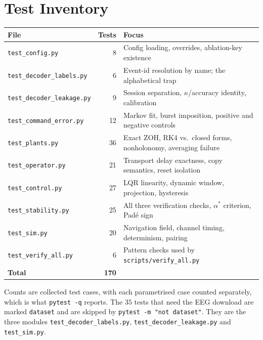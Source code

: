 \documentclass[11pt,a4paper]{article}
\newcommand{\astar}{\alpha^{*}}
\theoremstyle{plain}
\theoremstyle{definition}
\begin{document}
\section{Test Inventory}

\begin{center}
\small
\begin{tabular}{@{}lrp{7.4cm}@{}}
\toprule
File & Tests & Focus \\
\midrule
\texttt{test\_config.py}          & 8  & Config loading, overrides, ablation-key existence \\
\texttt{test\_decoder\_labels.py} & 6  & Event-id resolution by name; the alphabetical trap \\
\texttt{test\_decoder\_leakage.py}& 9  & Session separation, $\kappa$/accuracy identity, calibration \\
\texttt{test\_command\_error.py}  & 12 & Markov fit, burst imposition, positive and negative controls \\
\texttt{test\_plants.py}          & 36 & Exact ZOH, RK4 vs.\ closed forms, nonholonomy, averaging failure \\
\texttt{test\_operator.py}        & 21 & Transport delay exactness, copy semantics, reset isolation \\
\texttt{test\_control.py}         & 27 & LQR linearity, dynamic window, projection, hysteresis \\
\texttt{test\_stability.py}       & 25 & All three verification checks, $\astar$ criterion, Pad\'e sign \\
\texttt{test\_sim.py}             & 20 & Navigation field, channel timing, determinism, pairing \\
\texttt{test\_verify\_all.py}     & 6  & Pattern checks used by \texttt{scripts/verify\_all.py} \\
\midrule
\textbf{Total} & \textbf{170} & \\
\bottomrule
\end{tabular}
\end{center}

Counts are collected test cases, with each parametrised case counted
separately, which is what \texttt{pytest -q} reports. The $35$ tests
that need the EEG download are marked \texttt{dataset} and are skipped
by \texttt{pytest -m "not dataset"}. They are the three modules
\texttt{test\_decoder\_labels.py}, \texttt{test\_decoder\_leakage.py}
and \texttt{test\_sim.py}.
\end{document}
